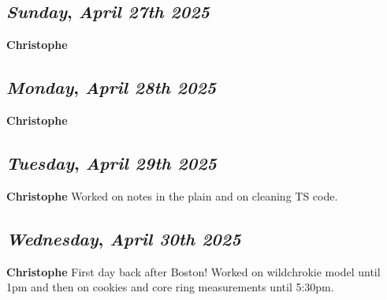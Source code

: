 \def\day{\textit{April 27th 2025}}
\def\weekday{\textit{Sunday}}
\subsection*{\weekday, \day}
\textbf {Christophe}

\def\day{\textit{April 28th 2025}}
\def\weekday{\textit{Monday}}
\subsection*{\weekday, \day}
\textbf {Christophe}

\def\day{\textit{April 29th 2025}}
\def\weekday{\textit{Tuesday}}
\subsection*{\weekday, \day}
\textbf {Christophe}
Worked on notes in the plain and on cleaning TS code.

\def\day{\textit{April 30th 2025}}
\def\weekday{\textit{Wednesday}}
\subsection*{\weekday, \day}
\textbf {Christophe}
First day back after Boston! Worked on wildchrokie model until 1pm and then on cookies and core ring measurements until 5:30pm.